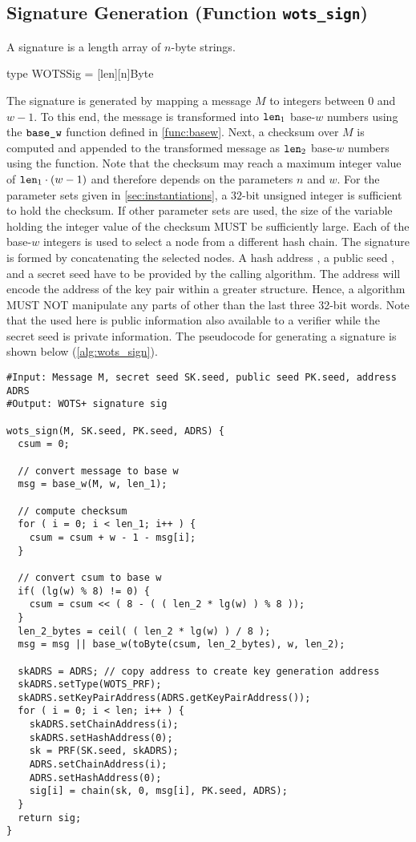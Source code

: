 \subsection{\wotsp Signature Generation (Function \texttt{wots\_sign})}
A \wotsp signature is a length \len array of $n$-byte strings.
\begin{code}
  type WOTSSig = [len][n]Byte
\end{code}
The \wotsp signature
is generated by mapping a message $M$ to \len integers between $0$ and $w - 1$.  To
this end, the message is transformed into $\texttt{len}_1$ base-$w$ numbers using
the $\texttt{base\_w}$ function defined in \autoref{func:basew}. Next, a checksum
over $M$ is
computed and appended to the transformed message as $\texttt{len}_2$ base-$w$ numbers
using the \basew function. Note that the checksum may reach a maximum integer
value of $\texttt{len}_1 \cdot (w - 1)$ and therefore depends on the
parameters $n$ and $w$. For the parameter sets given in
\autoref{sec:instantiations}, a $32$-bit unsigned
integer is sufficient to hold the checksum. If other parameter sets are used, the
size of the variable holding the integer value of the checksum MUST be
sufficiently large. Each of the base-$w$ integers is used to
select a node from a different hash chain. The signature is formed by
concatenating the selected
nodes. A \wotsp hash address \adrs, a public seed \pseed,
and a secret seed \sseed have to be provided by
the calling algorithm. The address will encode
the address of the \wotsp key pair within a greater structure. Hence, a \wotsp
algorithm MUST NOT manipulate any parts of \adrs other than the last three
32-bit words. Note that the \pseed used here is public information also
available to a verifier while the secret seed \sseed is private information.
The pseudocode for generating a \wotsp
signature  \wotssig is shown below
(\autoref{alg:wots_sign}).

\begin{lstlisting}[label=alg:wots_sign, language=pseudoc,
                   caption=\texttt{wots\_sign} -- Generating a WOTS+ signature on a message $M$.]
#Input: Message M, secret seed SK.seed, public seed PK.seed, address ADRS
#Output: WOTS+ signature sig

wots_sign(M, SK.seed, PK.seed, ADRS) {
  csum = 0;

  // convert message to base w
  msg = base_w(M, w, len_1);

  // compute checksum
  for ( i = 0; i < len_1; i++ ) {
    csum = csum + w - 1 - msg[i];
  }

  // convert csum to base w
  if( (lg(w) % 8) != 0) {
    csum = csum << ( 8 - ( ( len_2 * lg(w) ) % 8 ));
  }
  len_2_bytes = ceil( ( len_2 * lg(w) ) / 8 );
  msg = msg || base_w(toByte(csum, len_2_bytes), w, len_2);

  skADRS = ADRS; // copy address to create key generation address
  skADRS.setType(WOTS_PRF);
  skADRS.setKeyPairAddress(ADRS.getKeyPairAddress());
  for ( i = 0; i < len; i++ ) {
    skADRS.setChainAddress(i);
    skADRS.setHashAddress(0);
    sk = PRF(SK.seed, skADRS);
    ADRS.setChainAddress(i);
    ADRS.setHashAddress(0);
    sig[i] = chain(sk, 0, msg[i], PK.seed, ADRS);
  }
  return sig;
}
\end{lstlisting}

